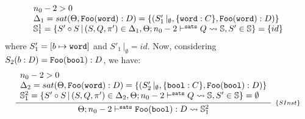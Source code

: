 \documentclass[a4paper, 11pt]{article}
\begin{document}
\begin{Example}
\[          {\begin{array}{l}
              n_0 - 2 > 0\\
              \Delta_1 = sat(\Theta, \mathtt{Foo}(\word) : D) = \{(S'_1\,|_\emptyset, \{\word : C\}, \mathtt{Foo}(\word) : D)\}\\
              \mathbb{S}^1_1 = \{S'\circ S\,|\,(S,Q,\pi') \in \Delta_1, \sats{Q}{\mathbb{S}}{n_0 - 2}, S' \in \mathbb{S}\} = \{id\}
           \end{array}}
  \]
  where $S'_1 = [b\mapsto \word]$ and $S'_1\,|_\emptyset = id$. Now, considering 
  $S_2(b : D) =\mathtt{Foo}(\bool) : D$, we have:
  \[
    \infer[_{\{SInst\}}]
          {\sats{\mathtt{Foo}(\bool) : D}{\mathbb{S}^2_1}{n_0 - 2}}
          {\begin{array}{l}
              n_0 - 2 > 0\\
              \Delta_2 = sat(\Theta, \mathtt{Foo}(\word) : D) = \{(S'_2\,|_\emptyset, \{\bool : C\}, \mathtt{Foo}(\bool) : D)\}\\
              \mathbb{S}^2_1 = \{S'\circ S\,|\,(S,Q,\pi') \in \Delta_2, \sats{Q}{\mathbb{S}}{n_0 - 2}, S' \in \mathbb{S}\} = \emptyset 
           \end{array}}
  \]
 



\end{Example}
\end{document}
